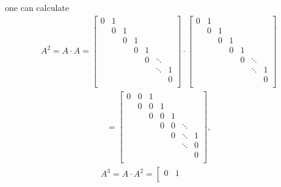 \documentclass[letterpaper,10pt,english]{jupyterBook}
\begin{document}
\sphinxAtStartPar
one can calculate
\begin{equation*}
\begin{split}
A^2 = A \cdot A =  
\left[ {\begin{array}{ccccccc}
    0 & 1 &  &  &  &  & \\
     & 0 & 1 &  &  &  &\\
     &  & 0 & 1 &  &  &\\
     &  &  & 0 & 1 &  &\\
     &  &  &  & 0 & \ddots &  \\
     &  &  &  &  & \ddots & 1 \\
     &  &  &  &  &  & 0 \\
\end{array} } \right]  \cdot 
\left[ {\begin{array}{ccccccc}
    0 & 1 &  &  &  &  & \\
     & 0 & 1 &  &  &  &\\
     &  & 0 & 1 &  &  &\\
     &  &  & 0 & 1 &  &\\
     &  &  &  & 0 & \ddots &  \\
     &  &  &  &  & \ddots & 1 \\
     &  &  &  &  &  & 0 \\
\end{array} } \right] 
\end{split}
\end{equation*}\begin{equation*}
\begin{split}
  =   \left[ {\begin{array}{ccccccc}
    0 & 0 & 1 &  &  &  & \\
     & 0 & 0 & 1 &  &  &\\
     &  & 0 & 0 & 1 &  &\\
     &  &  & 0 & 0 & \ddots &\\
     &  &  &  & 0 & \ddots & 1 \\
     &  &  &  &  & \ddots & 0 \\
     &  &  &  &  &  & 0 \\
\end{array} } \right], 
\end{split}
\end{equation*}\begin{equation*}
\begin{split}
    A^3 = A \cdot A^2 = \left[ {\begin{array}{ccccccc}
    0 & 1 &  &  &  &  & \\

\end{array}}
\end{split}
\end{equation*}
\end{document}

